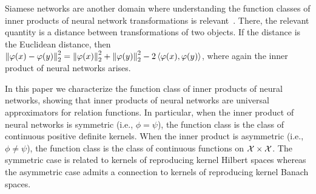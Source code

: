 Siamese networks are another domain where understanding the function classes of inner products of neural network transformations is relevant~\parencite[e.g.,][]{chopraLearningSimilarityMetric2005}. There, the relevant quantity is a distance between transformations of two objects. If the distance is the Euclidean distance, then $\left\lVert\varphi(x) - \varphi(y)\right\rVert_{2}^2 = \left\lVert\varphi(x)\right\rVert_{2}^2 + \left\lVert\varphi(y)\right\rVert_{2}^2 - 2 \left \langle \varphi(x), \varphi(y) \right\rangle$, where again the inner product of neural networks arises.

In this paper we characterize the function class of inner products of neural networks, showing that inner products of neural networks are universal approximators for relation functions. In particular, when the inner product of neural networks is symmetric (i.e., $\phi=\psi$), the function class is the class of continuous positive definite kernels. When the inner product is asymmetric (i.e., $\phi \neq \psi$), the function class is the class of continuous functions on ${\mathcal{X}} \times {\mathcal{X}}$. The symmetric case is related to kernels of reproducing kernel Hilbert spaces whereas the asymmetric case admits a connection to kernels of reproducing kernel Banach spaces.